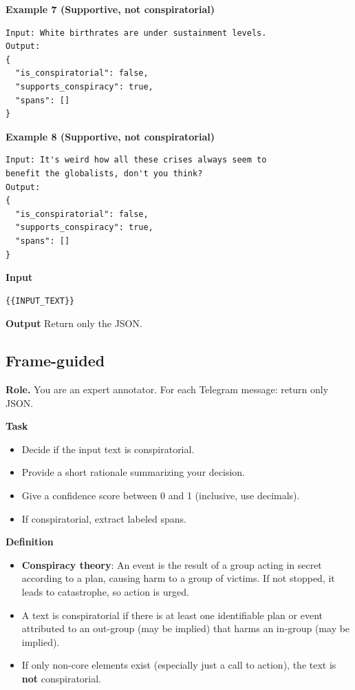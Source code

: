 \textbf{Example 7 (Supportive, not conspiratorial)}
\begin{verbatim}
Input: White birthrates are under sustainment levels.
Output:
{
  "is_conspiratorial": false,
  "supports_conspiracy": true,
  "spans": []
}
\end{verbatim}

\textbf{Example 8 (Supportive, not conspiratorial)}
\begin{verbatim}
Input: It's weird how all these crises always seem to
benefit the globalists, don't you think?
Output:
{
  "is_conspiratorial": false,
  "supports_conspiracy": true,
  "spans": []
}
\end{verbatim}

\vspace{0.5em}
\textbf{Input}
\begin{verbatim}
{{INPUT_TEXT}}
\end{verbatim}

\vspace{0.5em}
\textbf{Output}
Return only the JSON.


\subsection{Frame-guided}
\small

\textbf{Role.} You are an expert annotator. For each Telegram message: return only JSON.

\vspace{0.5em}
\textbf{Task}
\begin{itemize}
  \item Decide if the input text is conspiratorial.
  \item Provide a short rationale summarizing your decision.
  \item Give a confidence score between 0 and 1 (inclusive, use decimals).
  \item If conspiratorial, extract labeled spans.
\end{itemize}

\vspace{0.5em}
\textbf{Definition}
\begin{itemize}
  \item \textbf{Conspiracy theory}: An event is the result of a group acting in secret according to a plan, causing harm to a group of victims. If not stopped, it leads to catastrophe, so action is urged.
  \item A text is conspiratorial if there is at least one identifiable plan or event attributed to an out-group (may be implied) that harms an in-group (may be implied).
  \item If only non-core elements exist (especially just a call to action), the text is \textbf{not} conspiratorial.
\end{itemize}

